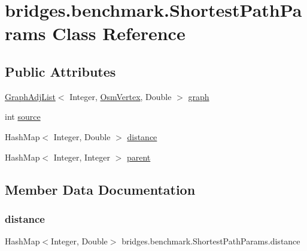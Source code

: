 \hypertarget{classbridges_1_1benchmark_1_1_shortest_path_params}{}\section{bridges.\+benchmark.\+Shortest\+Path\+Params Class Reference}
\label{classbridges_1_1benchmark_1_1_shortest_path_params}
\subsection*{Public Attributes}
\begin{DoxyCompactItemize}
\item 
\hyperlink{classbridges_1_1base_1_1_graph_adj_list}{Graph\+Adj\+List}$<$ Integer, \hyperlink{classbridges_1_1data__src__dependent_1_1_osm_vertex}{Osm\+Vertex}, Double $>$ \hyperlink{classbridges_1_1benchmark_1_1_shortest_path_params_a75cd38cc65e6e3979668291496f39a69}{graph}
\item 
int \hyperlink{classbridges_1_1benchmark_1_1_shortest_path_params_af3eb9881b40a82c81dfcc712f615628e}{source}
\item 
Hash\+Map$<$ Integer, Double $>$ \hyperlink{classbridges_1_1benchmark_1_1_shortest_path_params_a4fd89d26952a6e678436ef7cc46042c0}{distance}
\item 
Hash\+Map$<$ Integer, Integer $>$ \hyperlink{classbridges_1_1benchmark_1_1_shortest_path_params_a80973b4690d38af2030479a03e353800}{parent}
\end{DoxyCompactItemize}


\subsection{Member Data Documentation}
\mbox{\label{classbridges_1_1benchmark_1_1_shortest_path_params_a4fd89d26952a6e678436ef7cc46042c0}} 
\subsubsection{\texorpdfstring{distance}{distance}}
{\footnotesize\ttfamily Hash\+Map$<$Integer, Double$>$ bridges.\+benchmark.\+Shortest\+Path\+Params.\+distance}

